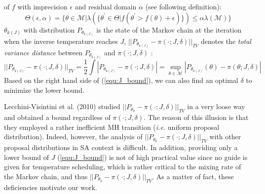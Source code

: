 \documentclass{article} %
\begin{document}
of $f$ with imprecision $\epsilon$ and residual domain $\alpha$ (see following definition):
\begin{equation}
	\Theta(\epsilon,\alpha)=\{\theta\in\mathcal{M}|\lambda(\{\theta^\prime \in \Theta | f(\theta^\prime > f(\theta) +\epsilon)\})\leq \alpha\lambda({\mathcal{M}})\}
\end{equation}
$\theta_{k(J)}$ with distribution $P_{\theta_{k(J)}}$ is the state of the Markov chain at the iteration when the inverse temperature reaches $J$, 
$||P_{\theta_{k(J)}}-\pi(\cdot; J, \delta)||_{TV}$ 
denotes the \emph{total variance distance} between  $P_{\theta_{k(J)}}$ and $\pi(\cdot; J, \delta)$ \cite{NDE_L1}: 
\begin{equation}
	||P_{\theta_{k(J)}}-\pi(\cdot; J, \delta)||_{TV}=\frac{1}{2}\int|P_{\theta_{k(J)}}-\pi(\cdot; J, \delta)|=\sup_{\theta\in\mathcal{M}} |P_{\theta_{k(J)}}(\theta)-\pi(\theta; J, \delta)|
\end{equation}
Based on the right hand side of (\ref{equ:J_bound}), we can also find an optimal $\delta$ to minimize the lower bound.  

Lecchini-Visintini et al. (2010) \cite{SA_finite_time} studied $||P_{\theta_{k}}-\pi(\cdot; J, \delta)||_{TV}$ in a very loose way and obtained 
a bound regardless of $\pi(\cdot; J, \delta)$. The reason of this illusion is that they employed a rather inefficient MH 
transition (\emph{i.e.} uniform proposal distribution). Indeed, however, the analysis of $||P_{\theta_{k}}-\pi(\cdot; J, \delta)||_{TV}$ with other proposal distributions  
in SA context is difficult.  In addition, providing only a lower bound of $J$ (\ref{equ:J_bound}) 
is not of high practical value since no guide is given for temperature scheduling, which is rather critical to the mixing rate of the Markov chain, and 
thus $||P_{\theta_{k}}-\pi(\cdot; J, \delta)||_{TV}$. As a matter of fact, these deficiencies motivate our work.  
\end{document}
